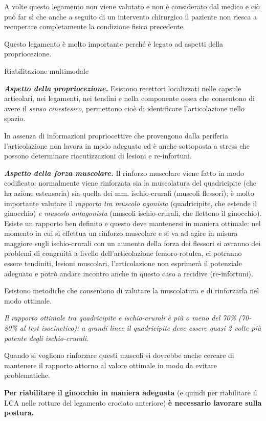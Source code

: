 \documentclass[]{article}
\begin{document}
A volte questo legamento non viene valutato e non è considerato dal
medico e ciò può far sì che anche a seguito di un intervento chirurgico
il paziente non riesca a recuperare completamente la condizione fisica
precedente.

Questo legamento è molto importante perché è legato ad aspetti della
propriocezione.

Riabilitazione multimodale

\emph{\textbf{Aspetto della propriocezione.}} Esistono recettori
localizzati nelle capsule articolari, nei legamenti, nei tendini e nella
componente ossea che consentono di avere il \emph{senso cinestesico},
permettono cioè di identificare l'articolazione nello spazio.

In assenza di informazioni propriocettive che provengono dalla periferia
l'articolazione non lavora in modo adeguato ed è anche sottoposta a
stress che possono determinare riacutizzazioni di lesioni e
re-infortuni.

\emph{\textbf{Aspetto della forza muscolare.}} Il rinforzo muscolare
viene fatto in modo codificato: normalmente viene rinforzata sia la
muscolatura del quadricipite (che ha azione estensoria) sia quella dei
mm. ischio-crurali (muscoli flessori); è molto importante valutare il
\emph{rapporto tra muscolo agonista} (quadricipite, che estende il
ginocchio) \emph{e muscolo antagonista} (muscoli ischio-crurali, che
flettono il ginocchio). Esiste un rapporto ben definito e questo deve
mantenersi in maniera ottimale: nel momento in cui si effettua un
rinforzo muscolare e si va ad agire in misura maggiore sugli
ischio-crurali con un aumento della forza dei flessori si avranno dei
problemi di congruità a livello dell'articolazione femoro-rotulea, ci
potranno essere tendiniti, lesioni muscolari, l'articolazione non
esprimerà il potenziale adeguato e potrò andare incontro anche in questo
caso a recidive (re-infortuni).

Esistono metodiche che consentono di valutare la muscolatura e di
rinforzarla nel modo ottimale.

\emph{Il rapporto ottimale tra quadricipite e ischio-crurali è più o
meno del 70\% (70-80\% al test isocinetico): a grandi linee il
quadricipite deve essere quasi 2 volte più potente degli ischio-crurali.
}

Quando si vogliono rinforzare questi muscoli si dovrebbe anche cercare
di mantenere il rapporto attorno al valore ottimale in modo da evitare
problematiche.

\textbf{Per riabilitare il ginocchio in maniera adeguata} (e quindi per
riabilitare il LCA nelle rotture del legamento crociato anteriore)
\textbf{è necessario lavorare sulla postura.}
\end{document}
